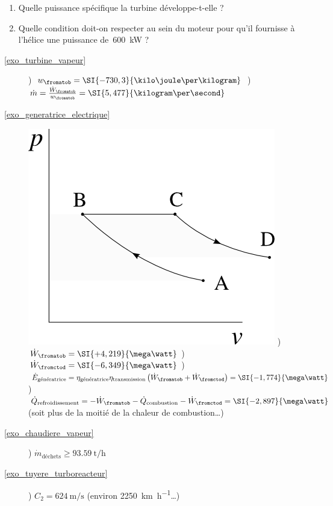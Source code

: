 	\begin{enumerate}
		\item Quelle puissance spécifique la turbine développe-t-elle ?
		\item Quelle condition doit-on respecter au sein du moteur pour qu’il fournisse à l’hélice une puissance de~\SI{600}{\kilo\watt} ?
	\end{enumerate}

\exercisesolutionpage
\titreresultats

\begin{description}
	\item [\ref{exo_turbine_vapeur}] 
					) $w_\fromatob = \SI{-730,3}{\kilo\joule\per\kilogram}$
					) $\dot m = \frac{\dot{W}_\fromatob}{w_\fromatob} = \SI{5,477}{\kilogram\per\second}$
	\item [\ref{exo_generatrice_electrique}]
					\includegraphics[width=\solutiondiagramwidth]{images/exo_pv_1.png}
					) $\dot{W}_\fromatob = \SI{+4,219}{\mega\watt}$
					) $\dot{W}_\fromctod = \SI{-6,349}{\mega\watt}$
					) $\dot{E}_\text{génératrice} = \eta_\text{génératrice} \eta_\text{transmission} \left(\dot{W}_\fromatob + \dot{W}_\fromctod\right) = \SI{-1,774}{\mega\watt}$
					) $\dot{Q}_\text{refroidissement} = - \dot{W}_\fromatob - \dot{Q}_\text{combustion} - \dot{W}_\fromctod = \SI{-2,897}{\mega\watt}$ (soit plus de la moitié de la chaleur de combustion…)
	\item [\ref{exo_chaudiere_vapeur}] 
					) $\dot{m}_\text{déchets} \geq \SI{93,59}{\tonne\per\hour}$
	\item [\ref{exo_tuyere_turboreacteur}] 
					) $C_2 = \SI{624}{\metre\per\second}$ (environ \SI[per-mode=symbol]{2250}{\kilo\metre\per\hour}…)

\end{description}
